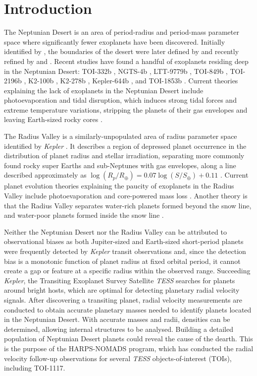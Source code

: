 \documentclass[fleqn,usenatbib,useAMS]{mnras}
\begin{document}
\section{Introduction}
The Neptunian Desert is an area of period-radius and period-mass parameter space where significantly fewer exoplanets have been discovered. Initially identified by \citet{Szabo2011}, the boundaries of the desert were later defined by \citet{Mazeh2016} and recently refined by \citet{Deeg2023} and \citet{CastroGonzalez2024:neptunian-desert}. Recent studies have found a handful of exoplanets residing deep in the Neptunian Desert: TOI-332b \citep{Osborn2023}, NGTS-4b \citep{West2019}, LTT-9779b \citep{Jenkins2020}, TOI-849b \citep{Armstrong2020}, TOI-2196b \citep{Persson2022}, K2-100b \citep{Barragan2019}, K2-278b \citep{Livingston2018}, Kepler-644b \citep{Morton2016}, and TOI-1853b \citep{Naponiello2023}. Current theories explaining the lack of exoplanets in the Neptunian Desert include photoevaporation and tidal disruption, which induces strong tidal forces and extreme temperature variations, stripping the planets of their gas envelopes and leaving Earth-sized rocky cores \citep[e.g.][]{Matsakos2016,Owen2018}.

The Radius Valley is a similarly-unpopulated area of radius parameter space identified by \textit{Kepler} \citep{Borucki2010}. It describes a region of depressed planet occurrence in the distribution of planet radius and stellar irradiation, separating more commonly found rocky super Earths and sub-Neptunes with gas envelopes, along a line described approximately as $\log (R_p/R_\oplus) = 0.07\log (S/S_\oplus)+0.11$ \citep{Ho2023, Fulton2017}. Current planet evolution theories explaining the paucity of exoplanets in the Radius Valley include photoevaporation and core-powered mass loss \citep{Gupta2020}. Another theory is that the Radius Valley separates water-rich planets formed beyond the snow line, and water-poor planets formed inside the snow line \citep{Venturini2020}.

Neither the Neptunian Desert nor the Radius Valley can be attributed to observational biases as both Jupiter-sized and Earth-sized short-period planets were frequently detected by \textit{Kepler} transit observations and, since the detection bias is a monotonic function of planet radius at fixed orbital period, it cannot create a gap or feature at a specific radius within the observed range. Succeeding \textit{Kepler}, the Transiting Exoplanet Survey Satellite \textit{TESS} \citep{Ricker2015} searches for planets around bright hosts, which are optimal for detecting planetary radial velocity signals. After discovering a transiting planet, radial velocity measurements are conducted to obtain accurate planetary masses needed to identify planets located in the Neptunian Desert. With accurate masses and radii, densities can be determined, allowing internal structures to be analysed. Building a detailed population of Neptunian Desert planets could reveal the cause of the dearth. This is the purpose of the HARPS-NOMADS program, which has conducted the radial velocity follow-up observations for several \textit{TESS} objects-of-interest (TOIs), including TOI-1117.
\end{document}
